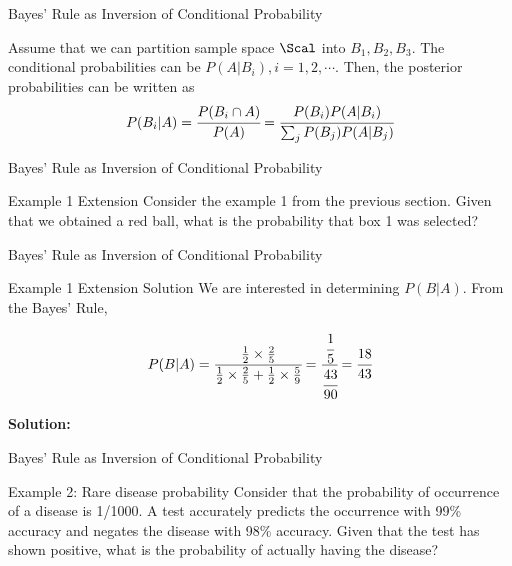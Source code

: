 \documentclass[aspectratio=169,xcolor=dvipsnames,svgnames,x11names,fleqn]{beamer}
\newcommand{\showanswers}{yes}
\begin{document}
    
    \begin{frame}[containsverbatim]{Bayes' Rule as Inversion of Conditional Probability}
    
    Assume that we can partition sample space $\Scal$ into $B_1, B_2, B_3$. The conditional probabilities can be $P(A|B_i), i = 1, 2, \cdots.$ Then, the posterior probabilities can be written as 
    \begin{equation}
        P(B_i | A) = \cfrac{P(B_i \cap A)}{P(A)} = \cfrac{P(B_i)P(A|B_i)}{\sum_j P(B_j)P(A|B_j)}
    \end{equation}

\end{frame}

\begin{frame}[containsverbatim]{Bayes' Rule as Inversion of Conditional Probability}
    
    \begin{exampleblock}{Example 1 Extension}
        Consider the example 1 from the previous section. Given that we obtained a red ball, what is the probability that box 1 was selected?
    \end{exampleblock}
    
\end{frame}

\begin{frame}[containsverbatim]{Bayes' Rule as Inversion of Conditional Probability}
    \ifthenelse{\equal{\showanswers}{yes}}
{
    \begin{examplesolution}{Example 1 Extension Solution}
        We are interested in determining $P(B|A)$. From the Bayes' Rule, 
    
        \begin{equation}
            P(B|A) = \cfrac{\frac{1}{2}\times \frac{2}{5}}{\frac{1}{2}\times \frac{2}{5} + \frac{1}{2}\times \frac{5}{9}} = \cfrac{\cfrac{1}{5}}{\cfrac{43}{90}} = \cfrac{18}{43}
        \end{equation}
    \end{examplesolution}
}{
    \textbf{Solution:} \color{LightGray}{Blank space for calculation}
}
\end{frame}

\begin{frame}[containsverbatim]{Bayes' Rule as Inversion of Conditional Probability}
    
    \begin{exampleblock}{Example 2: Rare disease probability}
        Consider that the probability of occurrence of a disease is 1/1000. A test accurately predicts the occurrence with 99\% accuracy and negates the disease with 98\% accuracy. Given that the test has shown positive, what is the probability of actually having the disease?
    \end{exampleblock}
    
\end{frame}
\end{document}
